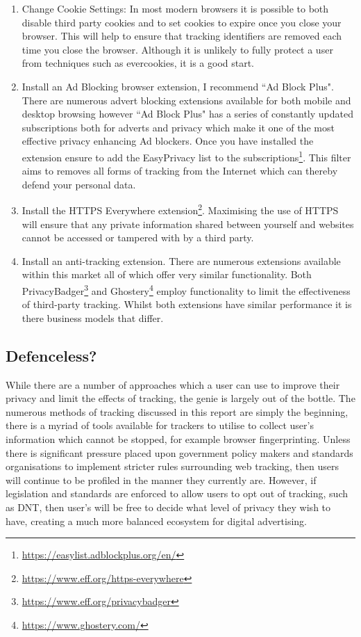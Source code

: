 \documentclass[12pt]{article}
\begin{document}
\begin{enumerate}
    \item Change Cookie Settings: In most modern browsers it is possible to both disable third party cookies and to set cookies to expire once you close your browser. This will help to ensure that tracking identifiers are removed each time you close the browser. Although it is unlikely to fully protect a user from techniques such as evercookies, it is a good start. 
    \item Install an Ad Blocking browser extension, I recommend ``Ad Block Plus". There are numerous advert blocking extensions available for both mobile and desktop browsing however ``Ad Block Plus" has a series of constantly updated subscriptions both for adverts and privacy which make it one of the most effective privacy enhancing Ad blockers. Once you have installed the extension ensure to add the EasyPrivacy list to the subscriptions\footnote{\url{ https://easylist.adblockplus.org/en/}}. This filter aims to removes all forms of tracking from the Internet which can thereby defend your personal data.
    \item Install the HTTPS Everywhere extension\footnote{ \url{https://www.eff.org/https-everywhere}}. Maximising the use of HTTPS will ensure that any private information shared between yourself and websites cannot be accessed or tampered with by a third party. 
    \item Install an anti-tracking extension. There are numerous extensions available within this market all of which offer very similar functionality. Both PrivacyBadger\footnote{\url{ https://www.eff.org/privacybadger}} and Ghostery\footnote{\url{ https://www.ghostery.com/}} employ functionality to limit the effectiveness of third-party tracking. Whilst both extensions have similar performance it is there business models that differ. 
\end{enumerate}

\subsection{Defenceless?}
While there are a number of approaches which a user can use to improve their privacy and limit the effects of tracking, the genie is largely out of the bottle. The numerous methods of tracking discussed in this report are simply the beginning, there is a myriad of tools available for trackers to utilise to collect user's information which cannot be stopped, for example browser fingerprinting. Unless there is significant pressure placed upon government policy makers and standards organisations to implement stricter rules surrounding web tracking, then users will continue to be profiled in the manner they currently are. However, if legislation and standards are enforced to allow users to opt out of tracking, such as DNT, then user's will be free to decide what level of privacy they wish to have, creating a much more balanced ecosystem for digital advertising.
\end{document}
